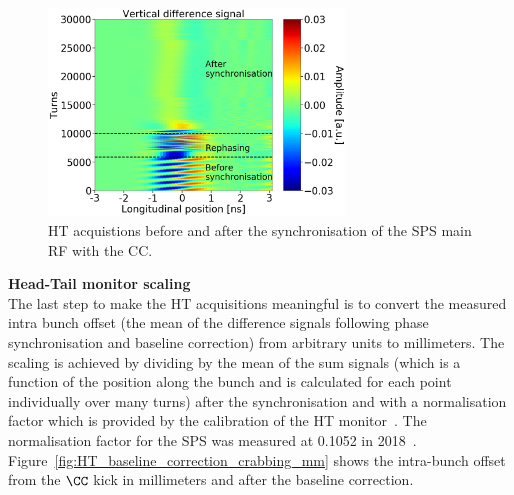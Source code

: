 \begin{figure}[!h]
   \centering         
   \includegraphics[width=0.7\textwidth]{images/Ch4/HT_2D__20180530_135105_before_after_sunchronisation_new_version.png}
       \caption{HT acquistions before and after the synchronisation of the SPS main RF with the CC.}
       \label{fig:HT_baseline_correction_measurements_2D}
\end{figure}


\normalsize{\textbf{Head-Tail monitor scaling}}\\
The last step to make the HT acquisitions meaningful is to convert the measured intra bunch offset (the mean of the difference signals following phase synchronisation and baseline correction) from arbitrary units to millimeters. The scaling is achieved by dividing by the mean of the sum signals (which is a function of the position along the bunch and is calculated for each point individually over many turns) after the synchronisation and with a normalisation factor which is provided by the calibration of the HT monitor~\cite{PhysRevAccelBeams.22.112803}. The normalisation factor for the SPS was measured at 0.1052 in 2018~\cite{HT_calibration_2018}. Figure~\ref{fig:HT_baseline_correction_crabbing_mm} shows the intra-bunch offset from the $\CC$ kick in millimeters and after the baseline correction. 

